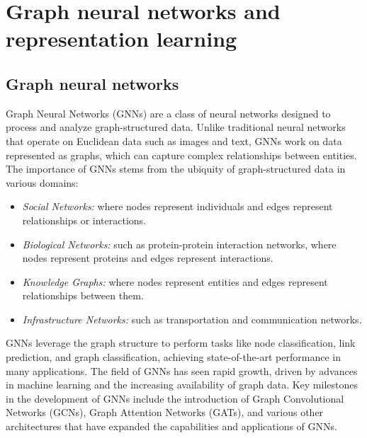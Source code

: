 \chapter{Graph neural networks and representation learning}
\label{sec:RepresentationLearning}

\section{Graph neural networks}

Graph Neural Networks (GNNs) are a class of neural networks designed to process and analyze graph-structured data. Unlike traditional neural networks that operate on Euclidean data such as images and text, GNNs work on data represented as graphs, which can capture complex relationships between entities. The importance of GNNs stems from the ubiquity of graph-structured data in various domains:

\begin{itemize}
    \item \emph{Social Networks:} where nodes represent individuals and edges represent relationships or interactions.
    \item \emph{Biological Networks:} such as protein-protein interaction networks, where nodes represent proteins and edges represent interactions.
    \item \emph{Knowledge Graphs:} where nodes represent entities and edges represent relationships between them.
    \item \emph{Infrastructure Networks:} such as transportation and communication networks.
\end{itemize}

GNNs leverage the graph structure to perform tasks like node classification, link prediction, and graph classification, achieving state-of-the-art performance in many applications.
The field of GNNs has seen rapid growth, driven by advances in machine learning and the increasing availability of graph data. Key milestones in the development of GNNs include the introduction of Graph Convolutional Networks (GCNs), Graph Attention Networks (GATs), and various other architectures that have expanded the capabilities and applications of GNNs.

